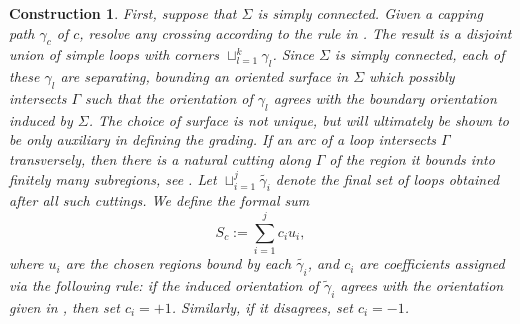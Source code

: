 \documentclass[11pt]{amsart}
\theoremstyle{mystyle}
\newtheorem{construction}[construction]{Construction}
\newcommand{\<}{\langle}
\renewcommand{\>}{\rangle}
\begin{document}
\begin{construction}\label{con:Seifert's algorithm}
    First, suppose that $\Sigma$ is simply connected. Given a capping path $\gamma_c$ of $c$, resolve any crossing according to the rule in . The result is a disjoint union of simple loops with corners $\sqcup_{l=1}^k\gamma_l$. Since $\Sigma$ is simply connected, each of these $\gamma_l$ are separating, bounding an oriented surface in $\Sigma$ which possibly intersects $\Gamma$ such that the orientation of $\gamma_l$ agrees with the boundary orientation induced by $\Sigma$. The choice of surface is not unique, but will ultimately be shown to be only auxiliary in defining the grading. If an arc of a loop intersects $\Gamma$ transversely, then there is a natural cutting along $\Gamma$ of the region it bounds into finitely many subregions, see . Let $\sqcup_{i=1}^j \tilde{\gamma_i}$ denote the final set of loops obtained after all such cuttings. We define the formal sum 
    \[S_c:=\sum_{i=1}^j c_i u_i,\]
    where $u_i$ are the chosen regions bound by each $\tilde{\gamma_i}$, and $c_i$ are coefficients assigned via the following rule: if the induced orientation of $\tilde{\gamma}_i$ agrees with the orientation given in , then set $c_i=+1$. Similarly, if it disagrees, set $c_i=-1$. 
\end{construction}
\end{document}
